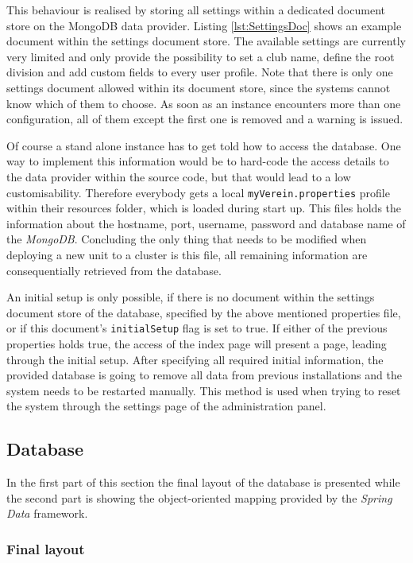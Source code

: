 This behaviour is realised by storing all settings within a dedicated document store on the MongoDB data provider. Listing \vref{lst:SettingsDoc} shows an example document within the settings document store. The available settings are currently very limited and only provide the possibility to set a club name, define the root division and add custom fields to every user profile. Note that there is only one settings document allowed within its document store, since the systems cannot know which of them to choose. As soon as an instance encounters more than one configuration, all of them except the first one is removed and a warning is issued. 

Of course a stand alone instance has to get told how to access the database. One way to implement this information would be to hard-code the access details to the data provider within the source code, but that would lead to a low customisability. Therefore everybody gets a local \texttt{myVerein.properties} profile within their resources folder, which is loaded during start up. This files holds the information about the hostname, port, username, password and database name of the \emph{MongoDB}. Concluding the only thing that needs to be modified when deploying a new unit to a cluster is this file, all remaining information are consequentially retrieved from the database.

An initial setup is only possible, if there is no document within the settings document store of the database, specified by the above mentioned properties file, or if this document's \texttt{initialSetup} flag is set to true. If either of the previous properties holds true, the access of the index page will present a page, leading through the initial setup. After specifying all required initial information, the provided database is going to remove all data from previous installations and the system needs to be restarted manually. This method is used when trying to reset the system through the settings page of the administration panel. 

\subsection{Database}
\label{sec:ImplementationDB}

In the first part of this section the final layout of the database is presented while the second part is showing the object-oriented mapping provided by the \emph{Spring Data} framework. 

\subsubsection{Final layout}
\label{sec:DatabaseFinal}

